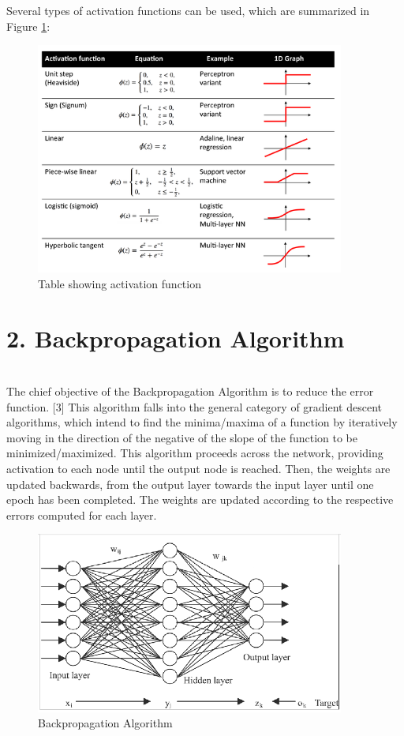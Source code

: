 Several types of activation functions can be used, which are summarized in Figure \ref{fig:NNtable}:
\begin{figure}[h!]\centering
	
	\includegraphics[width=4in]{fig/NNtable}
  \caption{Table showing activation function}\label{fig:NNtable}

    \end{figure}

\chapter{\textbf{2. Backpropagation Algorithm }}\\
The chief objective of the Backpropagation Algorithm is to reduce the error function. [3] This algorithm falls into the general category of gradient descent algorithms, which intend to find the minima/maxima of a function by iteratively moving in the direction of the negative of the slope of the function to be minimized/maximized. This algorithm proceeds across the network, providing activation to each node until the output node is reached. Then, the weights are updated backwards, from the output layer towards the input layer until one epoch has been completed. The weights are updated according to the respective errors computed for each layer. 

\begin{figure}[h!]\centering
	\includegraphics[width=4in]{fig/back}
	\caption{Backpropagation Algorithm}\label{fig:back}
\end{figure}

